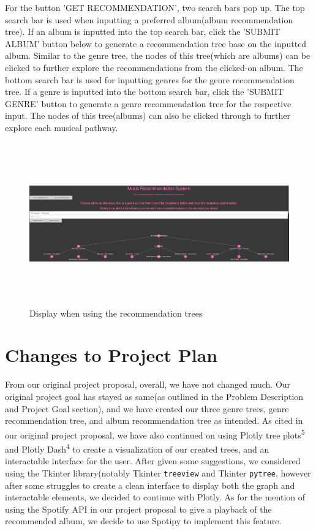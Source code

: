 \documentclass[fontsize=11pt]{article}
\begin{document}
For the button 'GET RECOMMENDATION', two search bars pop up. The top search bar is used when inputting a preferred album(album recommendation tree). If an album is inputted into the top search bar, click the 'SUBMIT ALBUM' button below to generate a recommendation tree base on the inputted album. Similar to the genre tree, the nodes of this tree(which are albums) can be clicked to further explore the recommendations from the clicked-on album. The bottom search bar is used for inputting genres for the genre recommendation tree. If a genre is inputted into the bottom search bar, click the 'SUBMIT GENRE' button to generate a genre recommendation tree for the respective input. The nodes of this tree(albums) can also be clicked through to further explore each musical pathway.

\begin{figure}[h]
    \centering
    \includegraphics[height=7cm, width=18cm]{examplerun.png}
    \caption{Display when using the recommendation trees}
    \label{fig:my_label}
\end{figure}

\section*{Changes to Project Plan}

From our original project proposal, overall, we have not changed much. Our original project goal has stayed as same(as outlined in the Problem Description and Project Goal section), and we have created our three genre trees, genre recommendation tree, and album recommendation tree as intended. As cited in our original project proposal, we have also continued on using Plotly tree plots\textsuperscript{5} and Plotly Dash\textsuperscript{4} to create a visualization of our created trees, and an interactable interface for the user. After given some suggestions, we considered using the Tkinter library(notably Tkinter \texttt{treeview} and Tkinter \texttt{pytree}, however after some struggles to create a clean interface to display both the graph and interactable elements, we decided to continue with Plotly. As for the mention of using the Spotify API in our project proposal to give a playback of the recommended album, we decide to use Spotipy to implement this feature.
\end{document}

